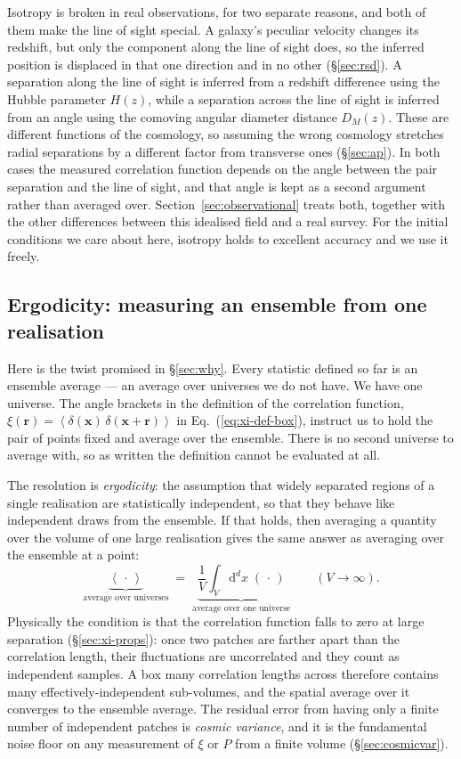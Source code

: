 \documentclass[12pt]{article}
\newcommand{\bx}{\mathbf{x}}
\newcommand{\br}{\mathbf{r}}
\newcommand{\avg}[1]{\left\langle #1 \right\rangle}
\begin{document}
Isotropy is broken in real observations, for two separate reasons, and
both of them make the line of sight special.  A galaxy's peculiar
velocity changes its redshift, but only the component along the line of
sight does, so the inferred position is displaced in that one direction
and in no other (\S\ref{sec:rsd}).  A separation along the line of sight is
inferred from a redshift difference using the Hubble parameter $H(z)$,
while a separation across the line of sight is inferred from an angle
using the comoving angular diameter distance $D_M(z)$.  These are
different functions of the cosmology, so assuming the wrong cosmology
stretches radial separations by a different factor from transverse ones
(\S\ref{sec:ap}).  In both cases
the measured correlation function depends on the angle between the pair
separation and the line of sight, and that angle is kept as a second
argument rather than averaged over.
Section~\ref{sec:observational} treats both, together with the other
differences between this idealised field and a real survey.  For the initial
conditions we care about here, isotropy holds to excellent accuracy and
we use it freely.

\subsection{Ergodicity: measuring an ensemble from one realisation}
\label{sec:ergodic}

Here is the twist promised in \S\ref{sec:why}.  Every statistic defined
so far is an ensemble average --- an average over universes we do not
have.  We have one universe.  The angle brackets in the definition of
the correlation function, $\xi(\br) = \avg{\delta(\bx)\,\delta(\bx+\br)}$
in Eq.~(\ref{eq:xi-def-box}), instruct us to hold the pair of points
fixed and average over the ensemble.  There is no second universe to
average with, so as written the definition cannot be evaluated at all.

The resolution is \emph{ergodicity}: the assumption that widely separated
regions of a single realisation are statistically independent, so that
they behave like independent draws from the ensemble.  If that holds,
then averaging a quantity over the volume of one large realisation gives
the same answer as averaging over the ensemble at a point:
\begin{equation}
  \underbrace{\avg{\,\cdot\,}}_{\text{average over universes}}
  \;=\;
  \underbrace{\frac{1}{V}\int_V \mathrm d^d x\;(\,\cdot\,)}_{\text{average over one universe}}
  \qquad (V \to \infty).
  \label{eq:ergodic}
\end{equation}
Physically the condition is that the correlation function falls to zero
at large separation (\S\ref{sec:xi-props}): once two patches are farther
apart than the correlation length, their fluctuations are uncorrelated
and they count as independent samples.  A box many correlation lengths across
therefore contains many effectively-independent sub-volumes, and the
spatial average over it converges to the ensemble average.  The residual
error from having only a finite number of independent patches is
\emph{cosmic variance}, and it is the fundamental noise floor on any
measurement of $\xi$ or $P$ from a finite volume (\S\ref{sec:cosmicvar}).
\end{document}
